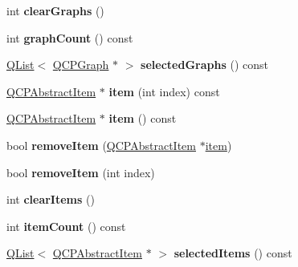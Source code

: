 \begin{DoxyCompactItemize}
int {\bfseries clear\+Graphs} ()
\item 
\mbox{\label{class_q_custom_plot_a5e1787cdde868c4d3790f9ebc8207d90}} 
int {\bfseries graph\+Count} () const
\item 
\mbox{\label{class_q_custom_plot_ad21914d95e6fd0dc07961fba64c445fb}} 
\hyperlink{class_q_list}{Q\+List}$<$ \hyperlink{class_q_c_p_graph}{Q\+C\+P\+Graph} $\ast$ $>$ {\bfseries selected\+Graphs} () const
\item 
\mbox{\label{class_q_custom_plot_abe6dad7d87c77ad906ffb6b0f5ddb868}} 
\hyperlink{class_q_c_p_abstract_item}{Q\+C\+P\+Abstract\+Item} $\ast$ {\bfseries item} (int index) const
\item 
\mbox{\label{class_q_custom_plot_a4f545f6a2c0e6c36e4421578f1592609}} 
\hyperlink{class_q_c_p_abstract_item}{Q\+C\+P\+Abstract\+Item} $\ast$ {\bfseries item} () const
\item 
\mbox{\label{class_q_custom_plot_ae04446557292551e8fb6e2c106e1848d}} 
bool {\bfseries remove\+Item} (\hyperlink{class_q_c_p_abstract_item}{Q\+C\+P\+Abstract\+Item} $\ast$\hyperlink{class_q_custom_plot_ac042f2e78edd228ccf2f26b7fe215239}{item})
\item 
\mbox{\label{class_q_custom_plot_abcfdda3d601c0441cab136137d715dea}} 
bool {\bfseries remove\+Item} (int index)
\item 
\mbox{\label{class_q_custom_plot_abdfd07d4f0591d0cf967f85013fd3645}} 
int {\bfseries clear\+Items} ()
\item 
\mbox{\label{class_q_custom_plot_a16025daf0341f9362be3080e404424c2}} 
int {\bfseries item\+Count} () const
\item 
\mbox{\label{class_q_custom_plot_a3b0cf9543f26b951a4c9869b4f16ecb8}} 
\hyperlink{class_q_list}{Q\+List}$<$ \hyperlink{class_q_c_p_abstract_item}{Q\+C\+P\+Abstract\+Item} $\ast$ $>$ {\bfseries selected\+Items} () const
\item 
\mbox{\label{class_q_custom_plot_ac9b1cf104dda6defb7718cefb05b1011}} 

\end{DoxyCompactItemize}
